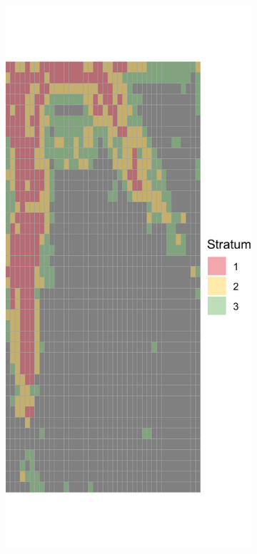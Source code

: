 \documentclass[a4paper,12pt]{article}
\begin{document}
\begin{figure}[H]
	\begin{subfigure}[b]{0.3\textwidth}
	  \centering
	  \includegraphics[width=\textwidth]{../grid_output/strata_viz/makenzijeva_strata.png}

\end{subfigure}
\end{figure}
\end{document}
